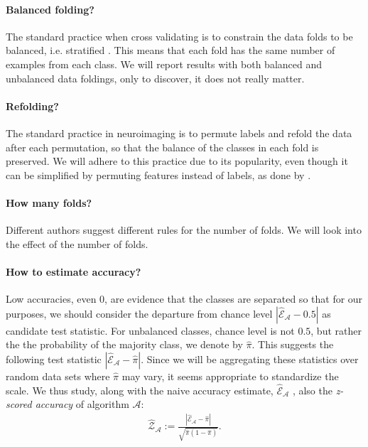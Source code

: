 \documentclass[12pt,a4paper]{article}
\theoremstyle{definition}
\newcommand{\accEstim}{\hat{\mathcal{E}}}
\newcommand{\accZ}{\hat{\mathcal{Z}}}
\newcommand{\majority}{\hat{\pi}}
\newcommand{\algo}{\mathcal{A}}
\begin{document}
\paragraph{Balanced folding?}
The standard practice when cross validating is to constrain the data folds to be balanced, i.e. stratified \citep[e.g.][]{ojala_permutation_2010}.
This means that each fold has the same number of examples from each class. 
We will report results with both balanced and unbalanced data foldings, only to discover, it does not really matter. 


\paragraph{Refolding?}
The standard practice in neuroimaging is to permute labels and refold the data after each permutation, so that the balance of the classes in each fold is preserved.
We will adhere to this practice due to its popularity, even though it can be simplified by permuting features instead of labels, as done by \citet{golland_permutation_2005}.


\paragraph{How many folds?}
Different authors suggest different rules for the number of folds. 
We will look into the effect of the number of folds. 

\paragraph{How to estimate accuracy?}
\label{sec:estimate_accuracy}
Low accuracies, even $0$, are evidence that the classes are separated so that for our purposes, we should consider the departure from chance level $|\accEstim_{\algo}-0.5|$ as candidate test statistic.
For unbalanced classes, chance level is not $0.5$, but rather the the probability of the majority class, we denote by $\majority$.
This suggests the following test statistic $|\accEstim_{\algo}-\majority|$.
Since we will be aggregating these statistics over random data sets where $\majority$ may vary, it seems appropriate to standardize the scale. 
We thus study, along with the naive accuracy estimate, $\accEstim_{\algo}$ , also the \emph{z-scored accuracy} of algorithm $\algo$:
\begin{align}
\label{eq:z_scored_accuracy}
	\accZ_{\algo} := \frac{|\accEstim_{\algo}-\majority|}{\sqrt{\majority(1-\majority)}}.
\end{align} 
\end{document}
